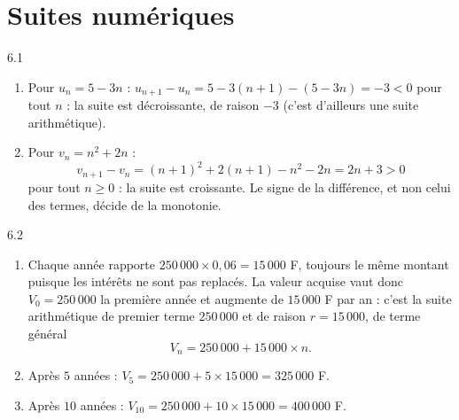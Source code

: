 \clearpage
\chapter{Suites numériques}

\begin{corrige}{6.1}
\begin{enumerate}
\item Pour $u_{n} = 5 - 3n$ : $u_{n+1} - u_{n} = 5 - 3(n + 1) - (5 - 3n) = -3 < 0$ pour tout $n$ : la suite est décroissante, de raison $-3$ (c'est d'ailleurs une suite arithmétique).
\item Pour $v_{n} = n^{2} + 2n$ :
\[
v_{n+1} - v_{n} = (n+1)^{2} + 2(n+1) - n^{2} - 2n = 2n + 3 > 0
\]
pour tout $n \geqslant 0$ : la suite est croissante. Le signe de la différence, et non celui des termes, décide de la monotonie.
\end{enumerate}
\end{corrige}

\begin{corrige}{6.2}
\begin{enumerate}
\item Chaque année rapporte $250\,000 \times 0{,}06 = 15\,000$ F, toujours le même montant puisque les intérêts ne sont pas replacés. La valeur acquise vaut donc $V_{0} = 250\,000$ la première année et augmente de $15\,000$ F par an : c'est la suite arithmétique de premier terme $250\,000$ et de raison $r = 15\,000$, de terme général
\[
V_{n} = 250\,000 + 15\,000 \times n .
\]
\item Après $5$ années : $V_{5} = 250\,000 + 5 \times 15\,000 = 325\,000$ F.
\item Après $10$ années : $V_{10} = 250\,000 + 10 \times 15\,000 = 400\,000$ F.
\end{enumerate}
\end{corrige}

